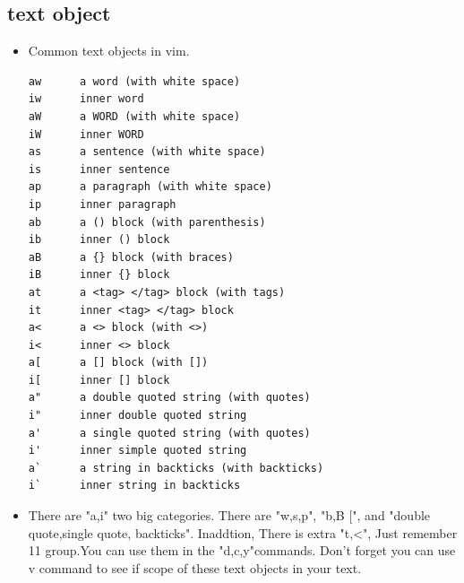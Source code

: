 \documentclass[a4paper,12pt,twoside]{book}
\begin{document}
\subsection{text object}
\begin{itemize}
		\item Common text objects in vim. 
\begin{verbatim}
aw		a word (with white space)
iw		inner word
aW		a WORD (with white space)
iW		inner WORD
as		a sentence (with white space)
is		inner sentence
ap		a paragraph (with white space)
ip		inner paragraph
ab		a () block (with parenthesis)
ib		inner () block
aB		a {} block (with braces)
iB		inner {} block
at		a <tag> </tag> block (with tags)
it		inner <tag> </tag> block
a<		a <> block (with <>)
i<		inner <> block
a[		a [] block (with [])
i[		inner [] block
a"		a double quoted string (with quotes)
i"		inner double quoted string
a'		a single quoted string (with quotes)
i'		inner simple quoted string
a`		a string in backticks (with backticks)
i`		inner string in backticks
\end{verbatim}
\item There are "a,i" two big categories. There are "w,s,p", "b,B $[$", and "double quote,single quote, backticks". Inaddtion, There is extra "t,<", Just remember 11 group.You can use them in the "d,c,y"commands. Don't forget you can use v command to see if scope of these text objects in your text.
				
		\end{itemize}
\end{document}
